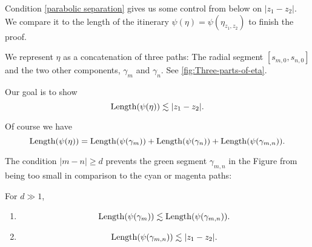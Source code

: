 Condition \eqref{parabolic separation} gives us some control from below on $|z_1-z_2|$. We compare it to the length of the itinerary $\psi(\eta)=\psi(\eta_{z_1,z_2})$ to finish the proof.

 

We represent $\eta$ as a concatenation of three paths: The radial segment $[s_{m,0},s_{n,0}]$ and the two other components, $\gamma _m$ and $\gamma_n$. See \cref{fig:Three-parts-of-eta}.

Our goal is to show 
\begin{equation} \label{quasiconvexity goal}
\operatorname{Length}(\psi(\eta)) \lesssim |z_1-z_2|.
\end{equation}


Of course we have
\begin{equation}
	\operatorname{Length}(\psi(\eta))=\operatorname{Length}(\psi(\gamma_m))+\operatorname{Length}(\psi(\gamma_n))+\operatorname{Length}(\psi(\gamma_{m,n})).
\end{equation}


The condition $|m-n| \geq d$ prevents the green segment $\gamma _{m,n}$ in the Figure from being too small in comparison to the cyan or magenta paths:
\begin{proposition} For $d \gg 1$, 
	\begin{enumerate}[label=(\roman*)]
		\item \begin{equation}
			\operatorname{Length}(\psi(\gamma_m)) \lesssim \operatorname{Length}(\psi(\gamma_{m,n})).
		\end{equation}
		
		\item 	\begin{equation}
			\operatorname{Length}(\psi(\gamma_{m,n})) \lesssim |z_1-z_2|.
		\end{equation}
		
	\end{enumerate}
\end{proposition}



